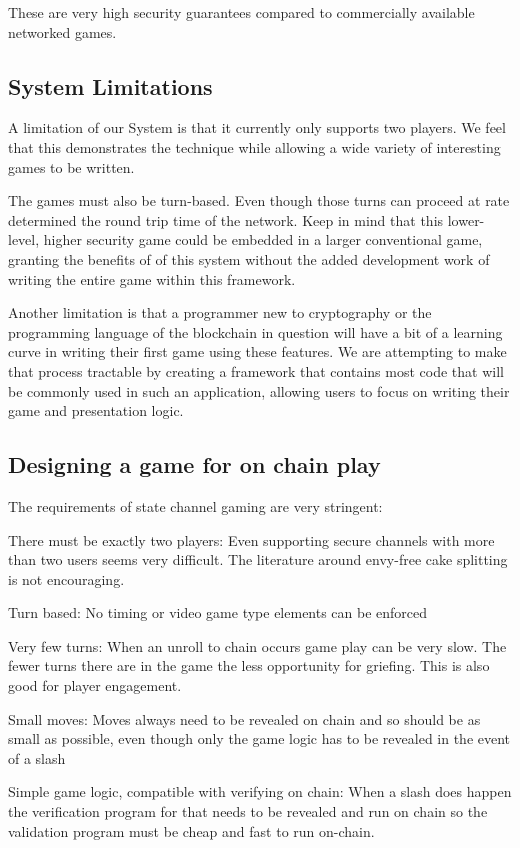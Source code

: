\documentclass[a4paper]{article}
\begin{document}
\begin{multicols}{2}
These are very high security guarantees compared to commercially available networked games.

\subsection{System Limitations}

A limitation of our System is that it currently only supports two players. We feel that this demonstrates the technique while allowing a wide variety of interesting games to be written.

The games must also be turn-based. Even though those turns can proceed at rate determined the round trip time of the network. Keep in mind that this lower-level, higher security  game could be embedded in a larger conventional game, granting the benefits of of this system without the added development work of writing the entire game within this framework.

Another limitation is that a programmer new to cryptography or the programming language of the blockchain in question will have a bit of a learning curve in writing their first game using these features. We are attempting to make that process tractable by creating a framework that contains most code that will be commonly used in such an application, allowing users to focus on writing their game and presentation logic.

\subsection{Designing a game for on chain play}

The requirements of state channel gaming are very stringent:

There must be exactly two players: Even supporting secure channels with more than two users seems very difficult. The literature around envy-free cake splitting is not encouraging.

Turn based: No timing or video game type elements can be enforced

Very few turns: When an unroll to chain occurs game play can be very slow. The fewer turns there are in the game the less opportunity for griefing. This is also good for player engagement.

Small moves: Moves always need to be revealed on chain and so should be as small as possible, even though only the game logic has to be revealed in the event of a slash

Simple game logic, compatible with verifying on chain: When a slash does happen the verification program for that needs to be revealed and run on chain so the validation program must be cheap and fast to run on-chain.


\end{multicols}
\end{document}
